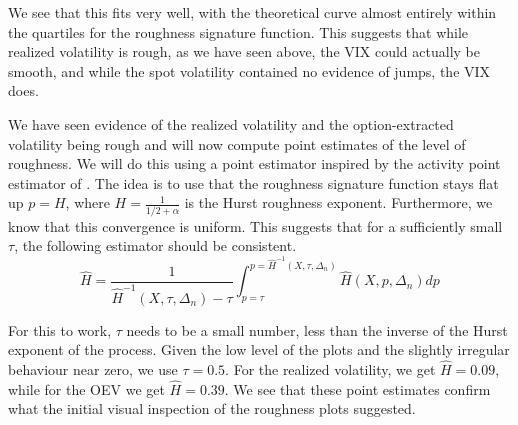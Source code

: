 \documentclass[fleqn,11pt,letterpaper]{article}
\theoremstyle{plain}
\theoremstyle{definition}
\theoremstyle{remark}
\numberwithin{equation}{section}
\begin{document}
We see that this fits very well, with the theoretical curve almost entirely within the quartiles for the roughness signature function. This suggests that while realized volatility is rough, as we have seen above, the VIX could actually be smooth, and while the spot volatility contained no evidence of jumps, the VIX does. 

We have seen evidence of the realized volatility and the option-extracted volatility being rough and will now compute point estimates of the level of roughness. We will do this using a point estimator inspired by the activity point estimator of \cite{Todorov2010}. The idea is to use that the roughness signature function stays flat up $p=H$, where $H=\frac{1}{1/2+\alpha}$ is the Hurst roughness exponent. Furthermore, we know that this convergence is uniform. This suggests that for a sufficiently small $\tau$, the following estimator should be consistent. 
\begin{equation} \label{eq:point_est_H}
    \hat{H} = \frac{1}{\hat{H}^{-1}(X,\tau,\Delta_n)-\tau}\int_{p=\tau}^{p=\hat{H}^{-1}(X,\tau,\Delta_n)}\hat{H}(X,p,\Delta_n)dp
\end{equation}

For this to work, $\tau$ needs to be a small number, less than the inverse of the Hurst exponent of the process. Given the low level of the plots and the slightly irregular behaviour near zero, we use $\tau=0.5$. For the realized volatility, we get $\hat{H}=0.09$, while for the OEV we get $\hat{H}=0.39$. We see that these point estimates confirm what the initial visual inspection of the roughness plots suggested.

\end{document}
